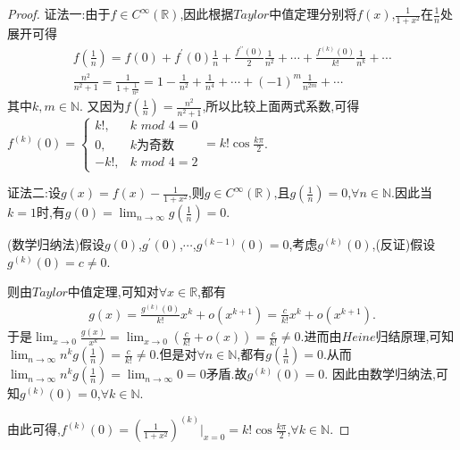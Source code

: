 \documentclass[lang=cn,newtx,10pt,scheme=chinese]{../Template/elegantbook}
\begin{document}
\begin{proof}
    {\color{blue}证法一:}由于\(f\in C^{\infty}(\mathbb{R})\),因此根据\(Taylor\)中值定理分别将\(f(x)\),\(\frac{1}{1 + x^2}\)在\(\frac{1}{n}\)处展开可得
\begin{gather*}
    f(\frac{1}{n}) = f(0) + f^{\prime}(0)\frac{1}{n} + \frac{f^{\prime\prime}(0)}{2}\frac{1}{n^2} + \cdots + \frac{f^{(k)}(0)}{k!}\frac{1}{n^k} + \cdots
    \\
    \frac{n^2}{n^2+1}=\frac{1}{1 + \frac{1}{n^2}} = 1 - \frac{1}{n^2} + \frac{1}{n^4} + \cdots + (-1)^m\frac{1}{n^{2m}} + \cdots
\end{gather*}
    其中\(k,m\in \mathbb{N}\).
    又因为$f\left( \frac{1}{n} \right) =\frac{n^2}{n^2+1}$,所以比较上面两式系数,可得\(f^{(k)}(0) = \begin{cases}
    k!, & k\,\,mod\,\,4 = 0\\
    0, & k\text{为奇数}\\
    -k!, & k\,\,mod\,\,4 = 2
    \end{cases} = k!\cos\frac{k\pi}{2}\).

    {\color{blue}证法二:}设\(g(x) = f(x) - \frac{1}{1 + x^2}\),则\(g\in C^{\infty}(\mathbb{R})\),且\(g(\frac{1}{n}) = 0\),\(\forall n\in \mathbb{N}\).因此当\(k = 1\)时,有\(g(0) = \lim_{n\rightarrow \infty}g(\frac{1}{n}) = 0\).

(数学归纳法)假设\(g(0)\),\(g^{\prime}(0)\),\(\cdots\),\(g^{(k - 1)}(0) = 0\),考虑\(g^{(k)}(0)\),(反证)假设\(g^{(k)}(0) = c\neq 0\).

则由\(Taylor\)中值定理,可知对\(\forall x\in \mathbb{R}\),都有
\begin{align*}
   g(x) = \frac{g^{(k)}(0)}{k!}x^k + o(x^{k + 1}) = \frac{c}{k!}x^k + o(x^{k + 1}).
\end{align*}
于是\(\lim_{x\rightarrow 0}\frac{g(x)}{x^k} = \lim_{x\rightarrow 0}(\frac{c}{k!} + o(x)) = \frac{c}{k!} \neq 0\).进而由\(Heine\)归结原理,可知\(\lim_{n\rightarrow \infty}n^kg(\frac{1}{n}) = \frac{c}{k!} \neq 0\).但是对\(\forall n\in \mathbb{N}\),都有\(g(\frac{1}{n}) = 0\).从而\(\lim_{n\rightarrow \infty}n^kg(\frac{1}{n}) = \lim_{n\rightarrow \infty}0 = 0\)矛盾.故\(g^{(k)}(0) = 0\).
因此由数学归纳法,可知\(g^{(k)}(0) = 0\),\(\forall k\in \mathbb{N}\).

由此可得,\(f^{(k)}(0) = (\frac{1}{1 + x^2})^{(k)}\Big|_{x = 0} = k!\cos\frac{k\pi}{2}\),\(\forall k\in \mathbb{N}\).

\end{proof}
\end{document}
